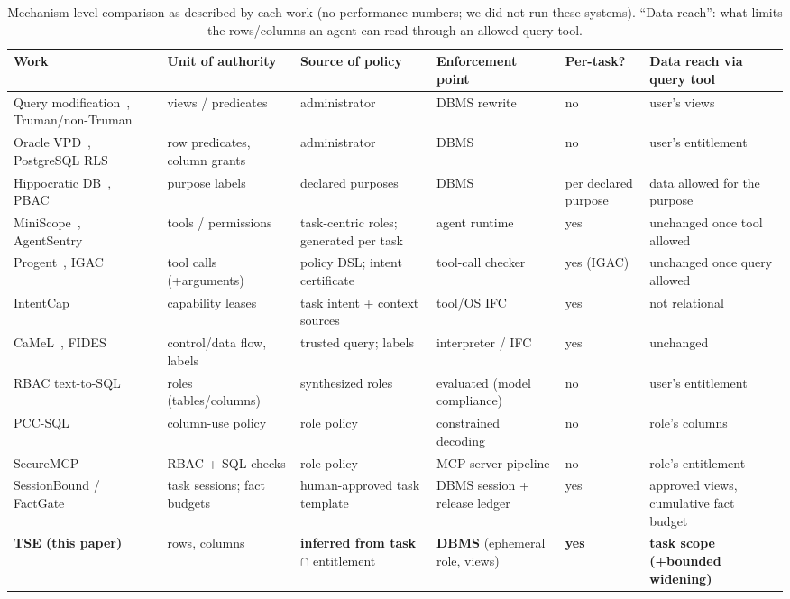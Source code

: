 \begin{table}[t]
\centering
\caption{Mechanism-level comparison as described by each work (no performance numbers; we did not run these systems).
``Data reach'': what limits the rows/columns an agent can read through an allowed query tool.}
\label{tab:mechanisms}
\footnotesize
\begin{tabular}{p{2.6cm}p{2.5cm}p{2.7cm}p{2.6cm}p{2.4cm}p{2.6cm}}
\hline
\textbf{Work} & \textbf{Unit of authority} & \textbf{Source of policy} & \textbf{Enforcement point} & \textbf{Per-task?} & \textbf{Data reach via query tool} \\
\hline
Query modification~\cite{stonebraker1975query}, Truman/non-Truman~\cite{rizvi2004extending} & views / predicates & administrator & DBMS rewrite & no & user's views \\
Oracle VPD~\cite{oraclevpd}, PostgreSQL RLS~\cite{pgrls} & row predicates, column grants & administrator & DBMS & no & user's entitlement \\
Hippocratic DB~\cite{agrawal2002hippocratic}, PBAC~\cite{byun2008purpose} & purpose labels & declared purposes & DBMS & per declared purpose & data allowed for the purpose \\
MiniScope~\cite{zhu2025miniscope}, AgentSentry~\cite{cai2025agentsentry} & tools / permissions & task-centric roles; generated per task & agent runtime & yes & unchanged once tool allowed \\
Progent~\cite{shi2025progent}, IGAC~\cite{zhu2026igac} & tool calls (+arguments) & policy DSL; intent certificate & tool-call checker & yes (IGAC) & unchanged once query allowed \\
IntentCap~\cite{zheng2026intentcap} & capability leases & task intent + context sources & tool/OS IFC & yes & not relational \\
CaMeL~\cite{debenedetti2026camel}, FIDES~\cite{costa2025fides} & control/data flow, labels & trusted query; labels & interpreter / IFC & yes & unchanged \\
RBAC text-to-SQL~\cite{fei2026rbac,klisura2026role} & roles (tables/columns) & synthesized roles & evaluated (model compliance) & no & user's entitlement \\
PCC-SQL~\cite{miyamoto2026pccsql} & column-use policy & role policy & constrained decoding & no & role's columns \\
SecureMCP~\cite{kim2026securemcp} & RBAC + SQL checks & role policy & MCP server pipeline & no & role's entitlement \\
SessionBound / FactGate~\cite{wu2026factgate} & task sessions; fact budgets & human-approved task template & DBMS session + release ledger & yes & approved views, cumulative fact budget \\
\textbf{TSE (this paper)} & rows, columns & \textbf{inferred from task} $\cap$ entitlement & \textbf{DBMS} (ephemeral role, views) & \textbf{yes} & \textbf{task scope (+bounded widening)} \\
\hline
\end{tabular}
\end{table}
